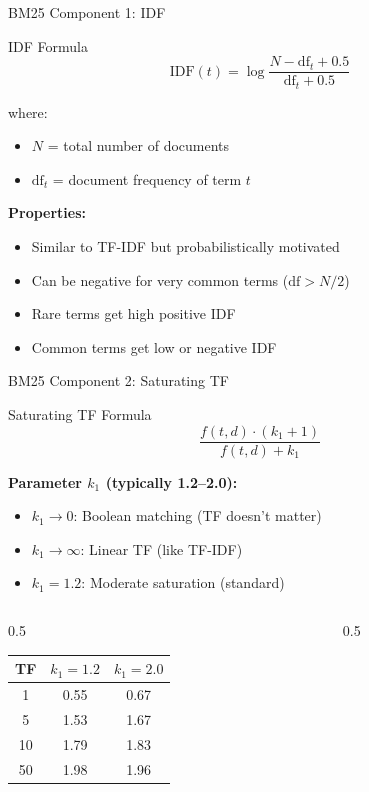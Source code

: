 \documentclass[aspectratio=169]{beamer}
\begin{document}
\begin{frame}{BM25 Component 1: IDF}
\begin{block}{IDF Formula}
$$\text{IDF}(t) = \log\frac{N - \text{df}_t + 0.5}{\text{df}_t + 0.5}$$
\end{block}

where:
\begin{itemize}
    \item $N$ = total number of documents
    \item $\text{df}_t$ = document frequency of term $t$
\end{itemize}

\vspace{1em}

\textbf{Properties:}
\begin{itemize}
    \item Similar to TF-IDF but probabilistically motivated
    \item Can be negative for very common terms ($\text{df} > N/2$)
    \item Rare terms get high positive IDF
    \item Common terms get low or negative IDF
\end{itemize}
\end{frame}

\begin{frame}{BM25 Component 2: Saturating TF}
\begin{block}{Saturating TF Formula}
$$\frac{f(t,d) \cdot (k_1+1)}{f(t,d) + k_1}$$
\end{block}

\textbf{Parameter $k_1$ (typically 1.2--2.0):}
\begin{itemize}
    \item $k_1 \to 0$: Boolean matching (TF doesn't matter)
    \item $k_1 \to \infty$: Linear TF (like TF-IDF)
    \item $k_1 = 1.2$: Moderate saturation (standard)
\end{itemize}

\vspace{1em}

\begin{columns}
\begin{column}{0.5\textwidth}
\small
\begin{tabular}{ccc}
\toprule
\textbf{TF} & \textbf{$k_1=1.2$} & \textbf{$k_1=2.0$} \\
\midrule
1 & 0.55 & 0.67 \\
5 & 1.53 & 1.67 \\
10 & 1.79 & 1.83 \\
50 & 1.98 & 1.96 \\
\bottomrule
\end{tabular}
\end{column}

\begin{column}{0.5\textwidth}

\end{column}
\end{columns}
\end{frame}
\end{document}
